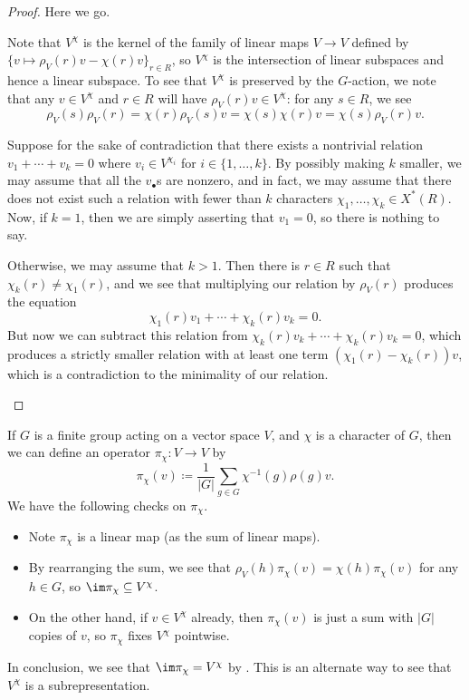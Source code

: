 \documentclass[../notes.tex]{subfiles}
\begin{document}
\begin{proof}
	Here we go.
	\begin{listalph}
		\item Note that $V^\chi$ is the kernel of the family of linear maps $V\to V$ defined by $\{v\mapsto\rho_V(r)v-\chi(r)v\}_{r\in R}$, so $V^\chi$ is the intersection of linear subspaces and hence a linear subspace. To see that $V^\chi$ is preserved by the $G$-action, we note that any $v\in V^\chi$ and $r\in R$ will have $\rho_V(r)v\in V^\chi$: for any $s\in R$, we see
		\[\rho_V(s)\rho_V(r)=\chi(r)\rho_V(s)v=\chi(s)\chi(r)v=\chi(s)\rho_V(r)v.\]

		\item Suppose for the sake of contradiction that there exists a nontrivial relation $v_1+\cdots+v_k=0$ where $v_i\in V^{\chi_i}$ for $i\in\{1,\ldots,k\}$. By possibly making $k$ smaller, we may assume that all the $v_\bullet$s are nonzero, and in fact, we may assume that there does not exist such a relation with fewer than $k$ characters $\chi_1,\ldots,\chi_k\in X^*(R)$. Now, if $k=1$, then we are simply asserting that $v_1=0$, so there is nothing to say.

		Otherwise, we may assume that $k>1$. Then there is $r\in R$ such that $\chi_k(r)\ne\chi_1(r)$, and we see that multiplying our relation by $\rho_V(r)$ produces the equation
		\[\chi_1(r)v_1+\cdots+\chi_k(r)v_k=0.\]
		But now we can subtract this relation from $\chi_k(r)v_k+\cdots+\chi_k(r)v_k=0$, which produces a strictly smaller relation with at least one term $(\chi_1(r)-\chi_k(r))v$, which is a contradiction to the minimality of our relation.
		\qedhere
	\end{listalph}
\end{proof}
\begin{remark}
	If $G$ is a finite group acting on a vector space $V$, and $\chi$ is a character of $G$, then we can define an operator $\pi_\chi\colon V\to V$ by
	\[\pi_\chi(v)\coloneqq\frac1{\left|G\right|}\sum_{g\in G}\chi^{-1}(g)\rho(g)v.\]
	We have the following checks on $\pi_\chi$.
	\begin{itemize}
		\item Note $\pi_\chi$ is a linear map (as the sum of linear maps).
		\item By rearranging the sum, we see that $\rho_V(h)\pi_\chi(v)=\chi(h)\pi_\chi(v)$ for any $h\in G$, so $\im\pi_\chi\subseteq V^\chi$.
		\item On the other hand, if $v\in V^\chi$ already, then $\pi_\chi(v)$ is just a sum with $\left|G\right|$ copies of $v$, so $\pi_\chi$ fixes $V^\chi$ pointwise.
	\end{itemize}
	In conclusion, we see that $\im\pi_\chi=V^\chi$ by . This is an alternate way to see that $V^\chi$ is a subrepresentation.
\end{remark}
\end{document}
